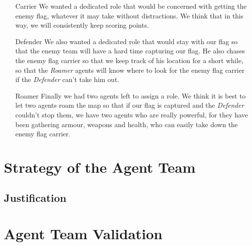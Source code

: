 \begin{enumerate}
\item[Carrier] We wanted a dedicated role that would be concerned with getting the enemy flag, whatever it may take without distractions. We think that in this way, we will consistently keep scoring points.

\item[Defender] We also wanted a dedicated role that would stay with our flag so that the enemy team will have a hard time capturing our flag. He also chases the enemy flag carrier so that we keep track of his location for a short while, so that the \emph{Roamer} agents will know where to look for the enemy flag carrier if the \emph{Defender} can't take him out.

\item[Roamer] Finally we had two agents left to assign a role. We think it is best to let two agents roam the map so that if our flag is captured and the \emph{Defender} couldn't stop them, we have two agents who are really powerful, for they have been gathering armour, weapons and health, who can easily take down the enemy flag carrier.
\end{enumerate} 

\section{Strategy of the Agent Team}

\subsection{Justification}

\section{Agent Team Validation}
